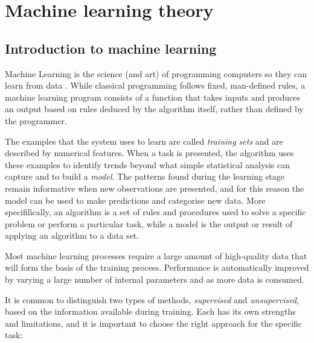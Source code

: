 

\chapter{Machine learning theory}
\label{ch:ml_theory}

\section{Introduction to machine learning}
\label{sec:introduction_to_ml}

Machine Learning is the science (and art) of programming computers so they can
learn from data \cite{geron2022hands}.
While classical programming follows fixed, man-defined rules, a machine learning program consists of a function that takes inputs and produces an output based on rules deduced by the algorithm itself, rather than defined by the programmer. 

The examples that the system uses to learn are called \textit{training sets} and are described by numerical features. When a task is presented, the algorithm uses these examples to identify trends beyond what simple statistical analysis can capture and to build a \textit{model}. The patterns found during the learning stage remain informative when new observations are presented, and for this reason the model can be used to make predictions and categorise new data. More specifilìcally, an algorithm is a set of rules and procedures used to solve a specific problem or perform a particular task, while a model is the output or result of applying an algorithm to a data set.

Most machine learning processes require a large amount of high-quality data that will form the basis of the training process.
Performance is automatically improved by varying a large number of internal parameters and as more data is consumed. 

It is common to distinguish two types of methods, \textit{supervised} and \textit{unsupervised}, based on the information available during training. Each has its own strengths and limitations, and it is important to choose the right approach for the specific task:

